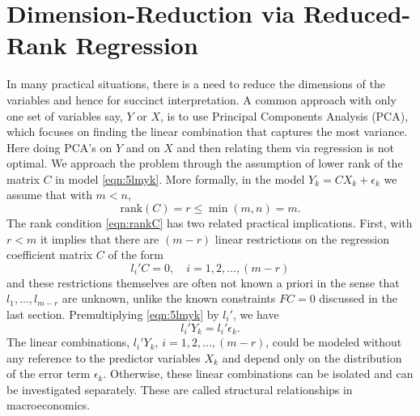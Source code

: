 \section{Dimension-Reduction via Reduced-Rank Regression \label{sec:s_dr}}

In many practical situations, there is a need to reduce the dimensions of the variables and hence for succinct interpretation. A common approach with only one set of variables say, $Y$ or $X$, is to use Principal Components Analysis (PCA), which focuses on finding the linear combination that captures the most variance. Here doing PCA's on $Y$ and on $X$ and then relating them via regression is not optimal. We approach the problem through the assumption of lower rank of the matrix $C$ in model \eqref{eqn:5lmyk}. More formally, in the model $Y_k= CX_k + \epsilon_k$ we assume that with $m < n$,
	\begin{equation} \label{eqn:rankC}
	\text{rank}(C)= r \leq \min(m,n)= m.
	\end{equation}
The rank condition \eqref{eqn:rankC} has two related practical implications. First, with $r < m$ it implies that there are $(m - r)$ linear restrictions on the regression coefficient matrix $C$ of the form
	\begin{equation} \label{eqn:lprimeC}
	l_i' C= 0, \quad i=1,2,\ldots,(m-r)
	\end{equation}
and these restrictions themselves are often not known a priori in the sense that $l_1, \ldots, l_{m-r}$ are unknown, unlike the known constraints $FC=0$ discussed in the last section. Premultiplying \eqref{eqn:5lmyk} by $l_i'$, we have
	\begin{equation} \label{eqn:lprimeY}
	l_i' Y_k= l_i' \epsilon_k.
	\end{equation}
The linear combinations, $l_i'Y_k$, $i=1,2,\ldots,(m-r)$, could be modeled without any reference to the predictor variables $X_k$ and depend only on the distribution of the error term $\epsilon_k$. Otherwise, these linear combinations can be isolated and can be investigated separately. These are called structural relationships in macroeconomics. 


